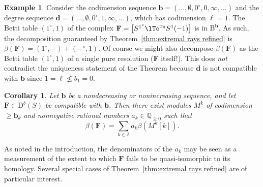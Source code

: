\documentclass[12pt]{amsart}
\newtheorem{cor}[lemma]{Corollary}
\theoremstyle{definition}
\newtheorem{example}[lemma]{Example}
\theoremstyle{remark}
\newcommand{\ZZ}{\mathbb{Z}}
\newcommand{\QQ}{\mathbb{Q}}
\newcommand{\bb}{\mathbf{b}}
\newcommand{\dd}{\mathbf{d}}
\newcommand{\FF}{\mathbf{F}}
\newcommand{\DD}{\mathrm{D}}
\newcommand{\BBQ}{\mathrm{B}}
\begin{document}
\begin{example}  

 Consider the codimension sequence $\bb=(\dots, \emptyset,0^\circ,0,\infty,\dots)$ and the degree sequence $\dd=(\dots, \emptyset,0^\circ ,1,\infty,\dots)$, which has codimension $\ell = 1$.  The Betti table 
 $(1^\circ, 1)$ of the complex $\FF=\left[ S^{1^\circ}\lTo^{x_{0}} S^1(-1)\right]$ is in $\BBQ^{\bb}$.
 As such, the decomposition guaranteed by Theorem~\ref{thm:extremal rays refined} is
 $\beta(\FF) = (1^{\circ}, -) + (-^{\circ}, 1)$. Of course we might also decompose $\beta(\FF)$
 as the Betti table $(1^{\circ}, 1)$ of a single pure resolution ($\FF$ itself!). This does \emph{not} contradict the uniqueness statement of the Theorem because $\dd$ is not compatible with $\bb$
 since $1= \ell \not\leq b_{1}= 0$.
\end{example}

% 
% 
%
%

\begin{cor}\label{cor:decompose refined}
Let $\bb$ be a nondecreasing or nonincreasing sequence, and let $\FF\in \DD^b(S)$ be compatible with $\bb$.  Then there exist modules $M^k$ of codimension $\geq \bb_k$ and nonnegative rational numbers $a_k\in \QQ_{\geq 0}$ such that
\[
\beta(\FF)=\sum_{k\in \ZZ} a_k\beta(M^k[k]).
\]
\end{cor}
As noted in the introduction, the denominators of the $a_k$ may be seen as a measurement of the extent to which $\FF$ fails to be quasi-isomorphic to its homology.  Several special cases of Theorem~\ref{thm:extremal rays refined} are of particular interest.
\end{document}
